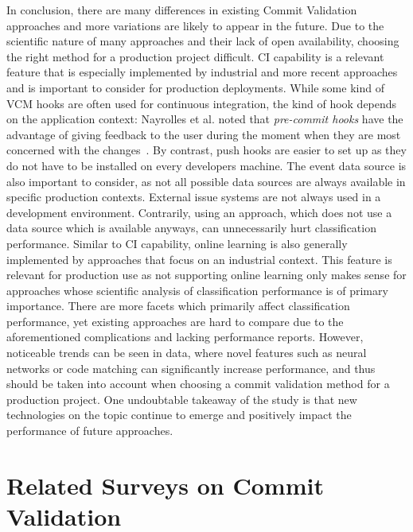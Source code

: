 In conclusion, there are many differences in existing Commit Validation approaches and more variations are likely to appear in the future. Due to the scientific nature of many approaches and their lack of open availability, choosing the right method for a production project difficult.
%
CI capability is a relevant feature that is especially implemented by industrial and more recent approaches and is important to consider for production deployments. While some kind of VCM hooks are often used for continuous integration, the kind of hook depends on the application context: Nayrolles et al. noted that \textit{pre-commit hooks} have the advantage of giving feedback to the user during the moment when they are most concerned with the changes~\cite{Nayrolles2018}. By contrast, push hooks are easier to set up as they do not have to be installed on every developers machine.
The event data source is also important to consider, as not all possible data sources are always available in specific production contexts. External issue systems are not always used in a development environment.
Contrarily, using an approach, which does not use a data source which is available anyways, can unnecessarily hurt classification performance.
%
Similar to CI capability, online learning is also generally implemented by approaches that focus on an industrial context. This feature is relevant for production use as not supporting online learning only makes sense for approaches whose scientific analysis of classification performance is of primary importance.
%
%
There are more facets which primarily affect classification performance, yet existing approaches are hard to compare due to the aforementioned complications and lacking performance reports. However, noticeable trends can be seen in data, where novel features such as neural networks or code matching can significantly increase performance, and thus should be taken into account when choosing a commit validation method for a production project. One undoubtable takeaway of the study is that new technologies on the topic continue to emerge and positively impact the performance of future approaches. 



\section{Related Surveys on Commit Validation}
\label{sec:relatedsurveys}

